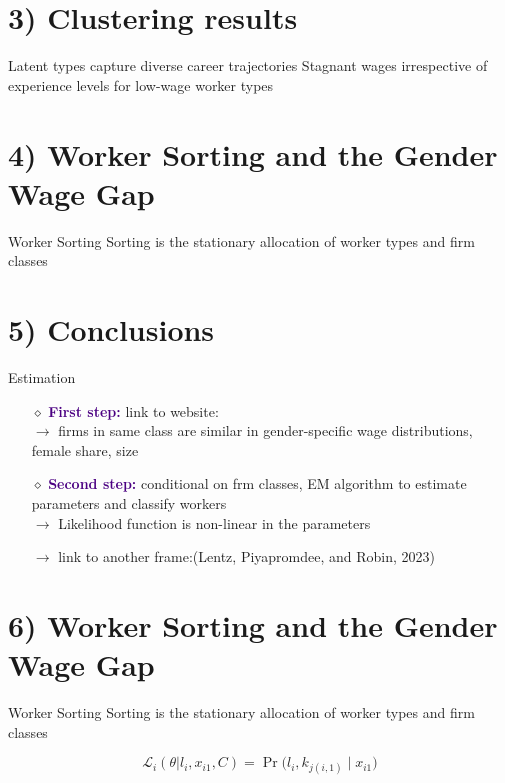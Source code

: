 \documentclass[aspectratio=169]{beamer}
\begin{document}
\section{3) Clustering results}
\begin{frame}[label=refthis1]{Latent types capture diverse career trajectories}
	Stagnant wages irrespective of experience levels for low-wage worker types
\end{frame}

\section{4) Worker Sorting and the Gender Wage Gap}
\begin{frame}{Worker Sorting}
	Sorting is the stationary allocation of worker types and firm classes
\end{frame}

\section{5) Conclusions}
\begin{frame}[label = eatimation]{Estimation}
\begin{itemize}
\item[$\diamond$] \textcolor{indigo}{\textbf{First step:}} link to website: \href{https://www.microsoft.com/zh-cn/}{}\\

$\rightarrow$ firms in same class are similar in gender-specific wage distributions, female share, size

\vspace{1cm}

\item[$\diamond$] \textcolor{indigo}{\textbf{Second step:}} conditional on frm classes, EM algorithm to estimate parameters and
classify workers\\

$\rightarrow$ Likelihood function is non-linear in the parameters

$\rightarrow$ link to another frame:\hyperlink{refthis1}{}\quad \textcolor{dgray}{(Lentz, Piyapromdee, and Robin, 2023)}
\end{itemize}
\vskip 3cm
\centering
\hyperlink{sort}{}
\quad
\href{https://www.microsoft.com/zh-cn/}{}
\end{frame}

\section{6) Worker Sorting and the Gender Wage Gap}
\begin{frame}[label = sort]{Worker Sorting}
	Sorting is the stationary allocation of worker types and firm classes \hyperlink{eatimation}{}
	
	$$\mathcal{L}_i(\theta|l_i,x_{i1},C)=\Pr\Big(l_i,k_{j(i,1)}\mid x_{i1}\Big)$$
\end{frame}
\end{document}
